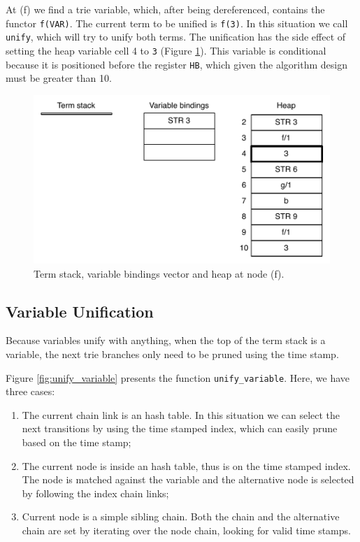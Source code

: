 At (f) we find a trie variable, which, after being dereferenced, contains the
functor \texttt{f(VAR)}. The current term to be unified is \texttt{f(3)}.
In this situation we call \texttt{unify}, which will try to unify both terms.
The unification has the side effect of setting the heap variable cell 4 to \texttt{3}
(Figure \ref{fig:collect_functor5}).
This variable is conditional because it is positioned before the register \texttt{HB},
which given the algorithm design must be greater than 10.

\begin{figure}[H]
  \centering
    \includegraphics[scale=0.6]{collect_functor5.pdf}
  \caption{Term stack, variable bindings vector and heap at node (f).}
  \label{fig:collect_functor5}
\end{figure}

\subsection{Variable Unification}

Because variables unify with anything, when the top of the term
stack is a variable, the next trie branches only need to be pruned using the time stamp.

Figure \ref{fig:unify_variable} presents the function
\texttt{unify\_variable}. Here, we have three cases:

\begin{enumerate}
  \item The current chain link is an hash table. In this situation we can select the next transitions by using the time stamped index, which can easily prune based on the time stamp;
  \item The current node is inside an hash table, thus is on the time stamped index. The node is matched against the variable and the alternative node is selected by following the index chain links;
  \item Current node is a simple sibling chain. Both the chain and the alternative chain are set by iterating over the node chain, looking for valid time stamps.
\end{enumerate}

